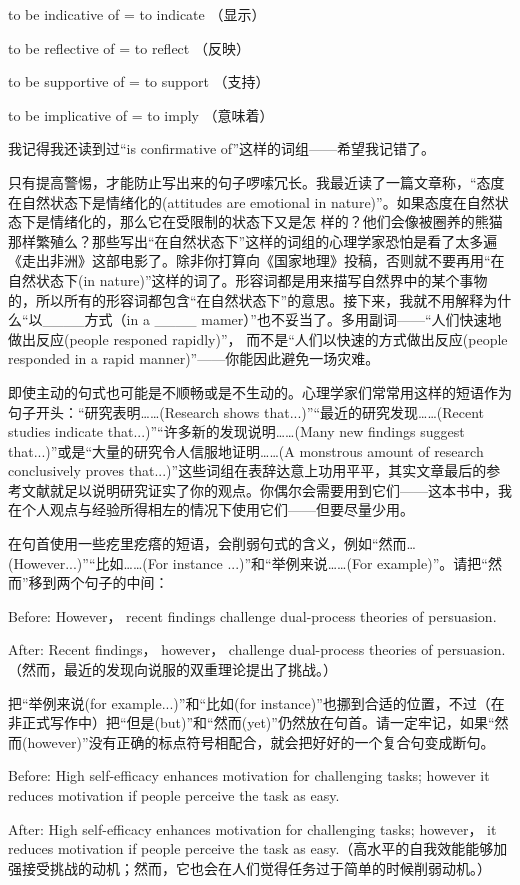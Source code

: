 to be indicative of = to indicate （显示）

to be reflective of = to reflect （反映）

to be supportive of = to support （支持）

to be implicative of = to imply （意味着）

我记得我还读到过“is confirmative of”这样的词组——希望我记错了。

只有提高警惕，才能防止写出来的句子啰嗦冗长。我最近读了一篇文章称，“态度在自然状态下是情绪化的(attitudes are emotional in nature)”。如果态度在自然状态下是情绪化的，那么它在受限制的状态下又是怎
样的？他们会像被圈养的熊猫那样繁殖么？那些写出“在自然状态下”这样的词组的心理学家恐怕是看了太多遍《走出非洲》这部电影了。除非你打算向《国家地理》投稿，否则就不要再用“在自然状态下(in nature)”这样的词了。形容词都是用来描写自然界中的某个事物的，所以所有的形容词都包含“在自然状态下”的意思。接下来，我就不用解释为什么“以\_\_\_\_方式（in a \_\_\_\_ mamer）”也不妥当了。多用副词——“人们快速地做出反应(people responed rapidly)”， 而不是“人们以快速的方式做出反应(people responded in a rapid manner)”——你能因此避免一场灾难。

即使主动的句式也可能是不顺畅或是不生动的。心理学家们常常用这样的短语作为句子开头：“研究表明……(Research shows that...)”“最近的研究发现……(Recent studies indicate that...)”“许多新的发现说明……(Many new findings suggest that...)”或是“大量的研究令人信服地证明……(A monstrous amount of research conclusively proves that...)”这些词组在表辞达意上功用平平，其实文章最后的参考文献就足以说明研究证实了你的观点。你偶尔会需要用到它们——这本书中，我在个人观点与经验所得相左的情况下使用它们——但要尽量少用。

在句首使用一些疙里疙瘩的短语，会削弱句式的含义，例如“然而…(However...)”“比如……(For instance ...)”和“举例来说……(For example)”。请把“然而”移到两个句子的中间：

{\kaishu Before: However， recent findings challenge dual-process theories of persuasion.

After: Recent findings， however， challenge dual-process theories of persuasion.（然而，最近的发现向说服的双重理论提出了挑战。）}

把“举例来说(for example...)”和“比如(for instance)”也挪到合适的位置，不过（在非正式写作中）把“但是(but)”和“然而(yet)”仍然放在句首。请一定牢记，如果“然而(however)”没有正确的标点符号相配合，就会把好好的一个复合句变成断句。

{\kaishu Before: High self-efficacy enhances motivation for challenging tasks; however it reduces motivation if people perceive the task as easy.

After: High self-efficacy enhances motivation for challenging tasks; however， it reduces motivation if people perceive the task as easy.（高水平的自我效能能够加强接受挑战的动机；然而，它也会在人们觉得任务过于简单的时候削弱动机。）}

